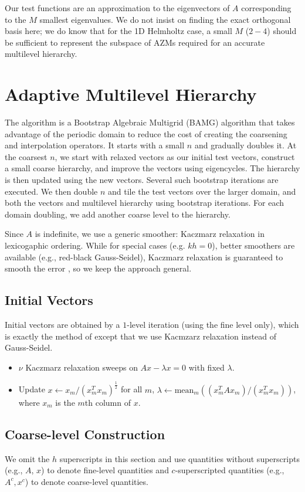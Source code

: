 \documentclass{article}
\begin{document}
Our test functions are an approximation to the eigenvectors of $A$ corresponding to the $M$ smallest eigenvalues. We do not insist on finding the exact orthogonal basis here; we do know that for the 1D Helmholtz case, a small $M$ ($2-4$) should be sufficient to represent the subspace of AZMs required for an accurate multilevel hierarchy.

\section{Adaptive Multilevel Hierarchy}
The algorithm is a Bootstrap Algebraic Multigrid (BAMG) algorithm that takes advantage of the periodic domain to reduce the cost of creating the coarsening and interpolation operators. It starts with a small $n$ and gradually doubles it. At the coarsest $n$, we start with relaxed vectors as our initial test vectors, construct a small coarse hierarchy, and improve the vectors using eigencycles. The hierarchy is then updated using the new vectors. Several such bootstrap iterations are executed. We then double $n$ and tile the test vectors over the larger domain, and both the vectors and multilevel hierarchy using bootstrap iterations. For each domain doubling, we add another coarse level to the hierarchy.

Since $A$ is indefinite, we use a generic smoother: Kaczmarz relaxation in lexicogaphic ordering. While for special cases (e.g. $k h = 0$), better smoothers are available (e.g., red-black Gauss-Seidel), Kaczmarz relaxation is guaranteed to smooth the error \cite{amg_theory}, so we keep the approach general.

\subsection{Initial Vectors}
Initial vectors are obtained by a $1$-level iteration (using the fine level only), which is exactly the method of \cite{mg_eigen} except that we use Kacmzarz relaxation instead of Gauss-Seidel.
\begin{itemize}
	\item $\nu$ Kaczmarz relaxation sweeps on $A x - \lambda x = 0$ with fixed $\lambda$.
	\item Update $x \longleftarrow x_m / (x_m^T x_m)^{\frac12}$ for all $m$, $\lambda \longleftarrow \text{mean}_m ((x_m^T A x_m)/(x_m^T x_m))$, where $x_m$ is the $m$th column of $x$.
\end{itemize}

\subsection{Coarse-level Construction}
We omit the $h$ superscripts in this section and use quantities without superscripts (e.g., $A$, $x$) to denote fine-level quantities and $c$-superscripted quantities (e.g., $A^c, x^c$) to denote coarse-level quantities.
\end{document}
